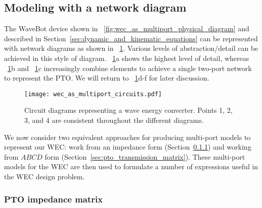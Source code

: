 \documentclass[5p,times]{elsarticle}
\begin{document}
\subsection{Modeling with a network diagram}\label{sec:modeling_with_a_network_diagram}

The WaveBot device shown in \figurename~\ref{fig:wec_as_multiport_physical_diagram} and described in Section~\ref{sec:dynamic_and_kinematic_equations} can be represented with network diagrams as shown in \figurename~\ref{fig:wec_as_multiport_circuits}.
Various levels of abstraction/detail can be achieved in this style of diagram.
\figurename~\ref{fig:wec_as_multiport_circuits}a shows the highest level of detail, whereas \figurename~\ref{fig:wec_as_multiport_circuits}b and \figurename~\ref{fig:wec_as_multiport_circuits}c increasingly combine elements to achieve a single two-port network to represent the PTO.
We will return to \figurename~\ref{fig:wec_as_multiport_circuits}d-f for later discussion.

\begin{figure}[htbp]
        \centering
        \texttt{[image: wec\_as\_multiport\_circuits.pdf]}
        \caption{Circuit diagrams representing a wave energy converter. Points 1, 2, 3, and 4 are consistent throughout the different diagrams.}
        \label{fig:wec_as_multiport_circuits}
\end{figure}

We now consider two equivalent approaches for producing multi-port models to represent our WEC: work from an impedance form (Section~\ref{sec:pto_impedance_matrix}) and working from $ABCD$ form (Section~\ref{sec:pto_transmission_matrix}).
These multi-port models for the WEC are then used to formulate a number of expressions useful in the WEC design problem.

\subsubsection{PTO impedance matrix}\label{sec:pto_impedance_matrix}
\end{document}
